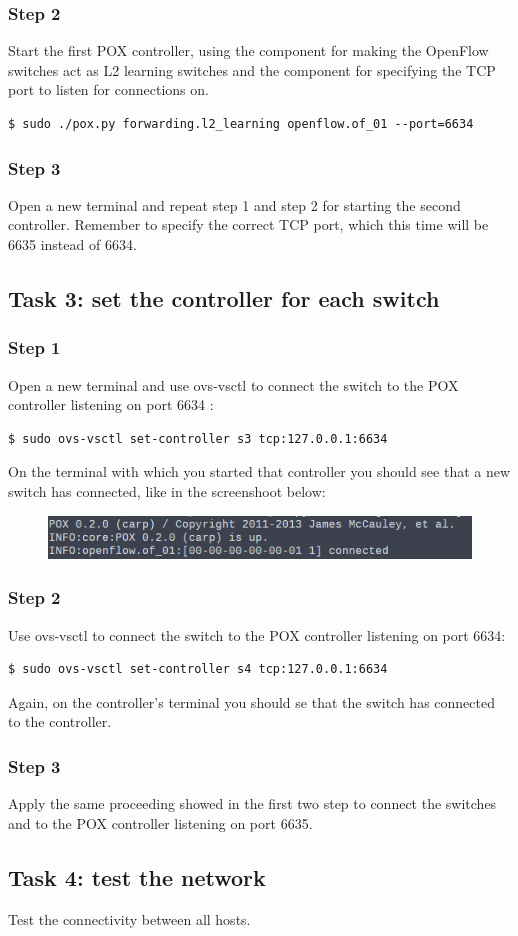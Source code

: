 \subsubsection*{Step 2}
Start the first POX controller, using the component 
for making the OpenFlow switches act as L2 learning switches and the component
 for specifying the TCP port to listen for connections on.

\lstset{basicstyle=\scriptsize\ttfamily}
\begin{lstlisting}
$ sudo ./pox.py forwarding.l2_learning openflow.of_01 --port=6634
\end{lstlisting}

\subsubsection*{Step 3}
Open a new terminal and repeat step 1 and step 2 for starting the second controller.
Remember to specify the correct TCP port, which this time will be 6635 instead of 6634.




\subsection*{Task 3: set the controller for each switch}
\subsubsection*{Step 1}
Open a new terminal and use ovs-vsctl to connect the switch  to the POX
controller listening on port 6634 \cite{ref-8}:
\begin{lstlisting}
$ sudo ovs-vsctl set-controller s3 tcp:127.0.0.1:6634
\end{lstlisting}
On the terminal with which you started that controller you should see that a new
switch has connected, like in the screenshoot below:
\begin{figure}[htb]
	\centering
	\includegraphics[width=1\linewidth]{img/controller-connection.png}
\end{figure}


\subsubsection*{Step 2}
Use ovs-vsctl to connect the switch  to the POX controller listening on
port 6634:
\begin{lstlisting}
$ sudo ovs-vsctl set-controller s4 tcp:127.0.0.1:6634
\end{lstlisting}
Again, on the controller's terminal you should se that the switch has connected
to the controller.


\subsubsection*{Step 3}
Apply the same proceeding showed in the first two step to connect the switches
 and  to the POX controller listening on port 6635.



\subsection*{Task 4: test the network}
Test the connectivity between all hosts.
